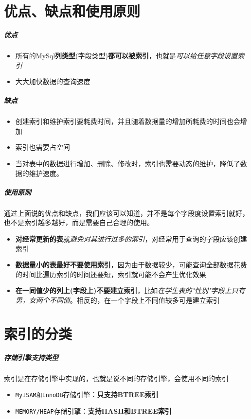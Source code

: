 \documentclass[UTF8,a4paper,12pt]{ctexbook}
\begin{document}
	\section{优点、缺点和使用原则}
		\subparagraph{优点}
			\begin{itemize}[itemindent = 1em]
				\item 所有的MySql\textbf{列类型}(字段类型)\textbf{都可以被索引}，也就是\textit{可以给任意字段设置索引}
				\item 大大加快数据的查询速度
			\end{itemize}
			
		\subparagraph{缺点}
			\begin{itemize}[itemindent = 1em]
				\item 创建索引和维护索引要耗费时间，并且随着数据量的增加所耗费的时间也会增加
				\item 索引也需要占空间
				\item 当对表中的数据进行增加、删除、修改时，索引也需要动态的维护，降低了数据的维护速度。
			\end{itemize}
			
		\subparagraph{使用原则}
			通过上面说的优点和缺点，我们应该可以知道，并不是每个字段度设置索引就好，也不是索引越多越好，而是需要自己合理的使用。
			\begin{itemize}[itemindent = 1em]
				\item \textbf{对经常更新的表}就\textit{避免对其进行过多的索引}，对经常用于查询的字段应该创建索引
				\item \textbf{数据量小的表最好不要使用索引}，因为由于数据较少，可能查询全部数据花费的时间比遍历索引的时间还要短，索引就可能不会产生优化效果
				\item \textbf{在一同值少的列上(字段上)不要建立索引}，比如\textit{在学生表的"性别"字段上只有男，女两个不同值}。相反的，在一个字段上不同值较多可是建立索引
			\end{itemize}
			
	\section{索引的分类}
		\subparagraph{存储引擎支持类型}
			索引是在存储引擎中实现的，也就是说不同的存储引擎，会使用不同的索引
			\begin{itemize}[itemindent = 2em]
				\item \verb|MyISAM和InnoDB|存储引擎：\textbf{只支持BTREE索引}
				\item \verb|MEMORY/HEAP|存储引擎：\textbf{支持HASH和BTREE索引}
			\end{itemize}
			
\end{document}
